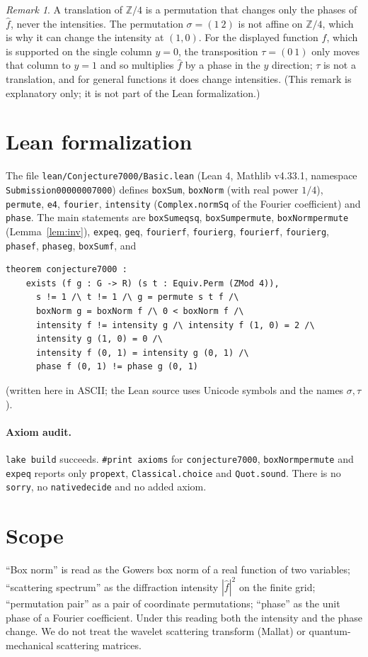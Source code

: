 \documentclass[11pt]{article}
\theoremstyle{definition}
\theoremstyle{remark}
\newtheorem{remark}[theorem]{Remark}
\renewcommand{\_}{\oldus\allowbreak}
\begin{document}
\begin{remark}
A translation of $\mathbb{Z}/4$ is a permutation that changes only the phases of $\hat f$, never the
intensities. The permutation $\sigma=(1\ 2)$ is not affine on $\mathbb{Z}/4$, which is why it can
change the intensity at $(1,0)$. For the displayed function $f$, which is supported on the single column
$y=0$, the transposition $\tau=(0\ 1)$ only moves that column to $y=1$ and so multiplies $\hat f$ by a phase in
the $y$ direction; $\tau$ is not a translation, and for general functions it does change intensities. (This remark is
explanatory only; it is not part of the Lean formalization.)
\end{remark}

\section{Lean formalization}

The file \texttt{lean/Conjecture7000/Basic.lean} (Lean 4, Mathlib v4.33.1, namespace
\texttt{Submission00000007000}) defines \texttt{boxSum}, \texttt{boxNorm} (with real power $1/4$),
\texttt{permute}, \texttt{e4}, \texttt{fourier}, \texttt{intensity} (\texttt{Complex.normSq} of the
Fourier coefficient) and \texttt{phase}. The main statements are \texttt{boxSum\_eq\_sq},
\texttt{boxSum\_permute}, \texttt{boxNorm\_permute} (Lemma~\ref{lem:inv}), \texttt{exp\_eq},
\texttt{g\_eq}, \texttt{fourier\_f\_10}, \texttt{fourier\_g\_10}, \texttt{fourier\_f\_01},
\texttt{fourier\_g\_01}, \texttt{phase\_f\_01}, \texttt{phase\_g\_01}, \texttt{boxSum\_f}, and
\begin{verbatim}
theorem conjecture7000 :
    exists (f g : G -> R) (s t : Equiv.Perm (ZMod 4)),
      s != 1 /\ t != 1 /\ g = permute s t f /\
      boxNorm g = boxNorm f /\ 0 < boxNorm f /\
      intensity f != intensity g /\ intensity f (1, 0) = 2 /\
      intensity g (1, 0) = 0 /\
      intensity f (0, 1) = intensity g (0, 1) /\
      phase f (0, 1) != phase g (0, 1)
\end{verbatim}
(written here in ASCII; the Lean source uses Unicode symbols and the names $\sigma,\tau$).

\paragraph{Axiom audit.} \texttt{lake build} succeeds. \texttt{\#print axioms} for
\texttt{conjecture7000}, \texttt{boxNorm\_permute} and \texttt{exp\_eq} reports only
\texttt{propext}, \texttt{Classical.choice} and \texttt{Quot.sound}. There is no \texttt{sorry}, no
\texttt{native\_decide} and no added axiom.

\section{Scope}

``Box norm'' is read as the Gowers box norm of a real function of two variables; ``scattering
spectrum'' as the diffraction intensity $|\hat f|^2$ on the finite grid; ``permutation pair'' as a
pair of coordinate permutations; ``phase'' as the unit phase of a Fourier coefficient. Under this
reading both the intensity and the phase change. We do not treat the wavelet scattering transform
(Mallat) or quantum-mechanical scattering matrices.
\end{document}
